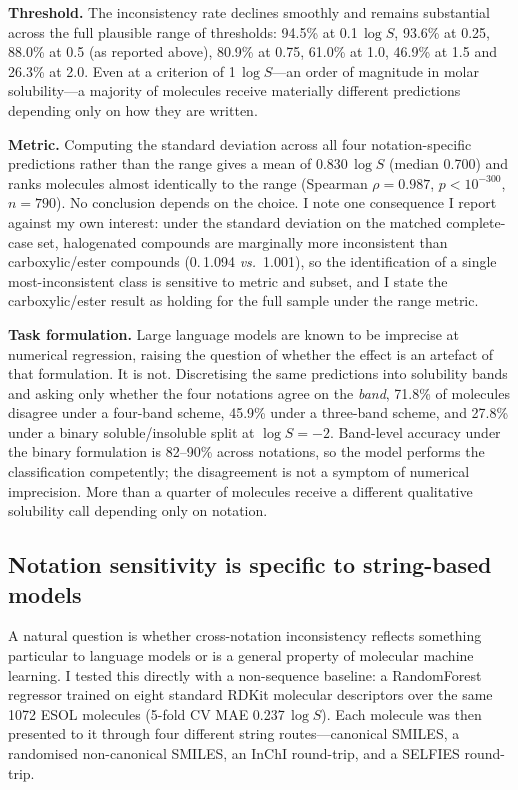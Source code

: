 \documentclass[twoside,twocolumn,9pt]{article}
\newcommand{\logS}{\ensuremath{\log S}}
\begin{document}
\textbf{Threshold.} The inconsistency rate declines smoothly and remains substantial across the full plausible range of thresholds: 94.5\% at 0.1\,$\logS$, 93.6\% at 0.25, 88.0\% at 0.5 (as reported above), 80.9\% at 0.75, 61.0\% at 1.0, 46.9\% at 1.5 and 26.3\% at 2.0. Even at a criterion of 1\,$\logS$---an order of magnitude in molar solubility---a majority of molecules receive materially different predictions depending only on how they are written.

\textbf{Metric.} Computing the standard deviation across all four notation-specific predictions rather than the range gives a mean of 0.830\,$\logS$ (median 0.700) and ranks molecules almost identically to the range (Spearman $\rho=0.987$, $p<10^{-300}$, $n=790$). No conclusion depends on the choice. I note one consequence I report against my own interest: under the standard deviation on the matched complete-case set, halogenated compounds are marginally more inconsistent than carboxylic/ester compounds (0.\,1.094 \textit{vs.}\ 1.001), so the identification of a single most-inconsistent class is sensitive to metric and subset, and I state the carboxylic/ester result as holding for the full sample under the range metric.

\textbf{Task formulation.} Large language models are known to be imprecise at numerical regression, raising the question of whether the effect is an artefact of that formulation. It is not. Discretising the same predictions into solubility bands and asking only whether the four notations agree on the \textit{band}, 71.8\% of molecules disagree under a four-band scheme, 45.9\% under a three-band scheme, and 27.8\% under a binary soluble/insoluble split at $\logS=-2$. Band-level accuracy under the binary formulation is 82--90\% across notations, so the model performs the classification competently; the disagreement is not a symptom of numerical imprecision. More than a quarter of molecules receive a different qualitative solubility call depending only on notation.

\subsection{Notation sensitivity is specific to string-based models}
\label{sec:baseline}

A natural question is whether cross-notation inconsistency reflects something particular to language models or is a general property of molecular machine learning. I tested this directly with a non-sequence baseline: a RandomForest regressor trained on eight standard RDKit molecular descriptors over the same 1072 ESOL molecules (5-fold CV MAE 0.237\,$\logS$). Each molecule was then presented to it through four different string routes---canonical SMILES, a randomised non-canonical SMILES, an InChI round-trip, and a SELFIES round-trip.
\end{document}
